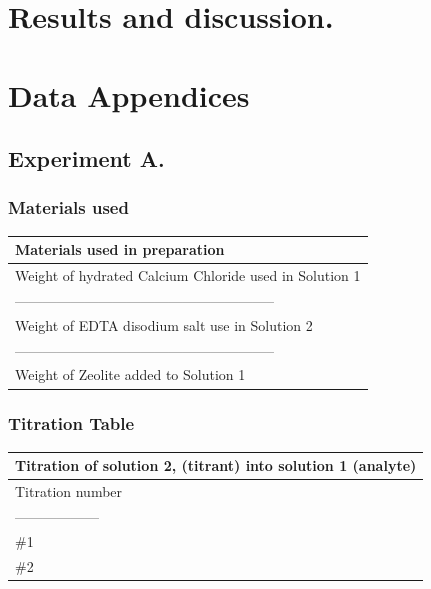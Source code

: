 \documentclass[]{article}
\begin{document}
\hypertarget{results-and-discussion.}{%
\section{Results and discussion.}\label{results-and-discussion.}}

\hypertarget{data-appendices}{%
\section{Data Appendices}\label{data-appendices}}

\hypertarget{experiment-a.}{%
\subsection{Experiment A.}\label{experiment-a.}}

\hypertarget{materials-used}{%
\subsubsection{Materials used}\label{materials-used}}

\begin{longtable}[]{@{}l@{}}
\toprule
Materials used in preparation\tabularnewline
\midrule
\endhead
Weight of hydrated Calcium Chloride used in Solution 1\tabularnewline
--------------------------------------------------------\tabularnewline
Weight of EDTA disodium salt use in Solution 2\tabularnewline
--------------------------------------------------------\tabularnewline
Weight of Zeolite added to Solution 1\tabularnewline
\bottomrule
\end{longtable}

\hypertarget{titration-table}{%
\subsubsection{Titration Table}\label{titration-table}}

\begin{longtable}[]{@{}l@{}}
\toprule
Titration of solution 2, (titrant) into solution 1
(analyte)\tabularnewline
\midrule
\endhead
Titration number\tabularnewline
------------------\tabularnewline
\#1\tabularnewline
\#2\tabularnewline
\bottomrule
\end{longtable}
\end{document}
